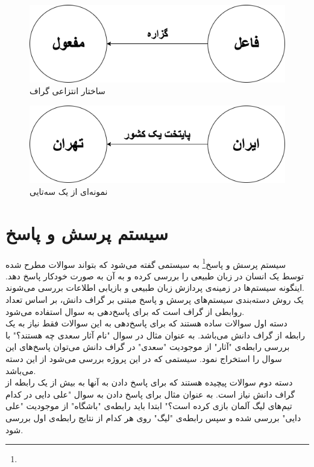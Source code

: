 \begin{multicols}{2}
\begin{figure}[H]
	\centering
	\includegraphics[scale=0.375]{figures/rdf/structure.png}
	\caption[ساختار انتزاعی گراف ]{ساختار انتزاعی گراف }
	\label{fig:rdf-strcutre}
\end{figure}
	\columnbreak
\begin{figure}[H]
	\centering
	\includegraphics[scale=0.375]{figures/rdf/sample.png}
	\caption[نمونه‌ای از یک سه‌تایی ]{نمونه‌ای از یک سه‌تایی }
	\label{fig:rdf-sample}
\end{figure}
\end{multicols}

\section{سیستم پرسش و پاسخ}
سیستم‌ پرسش و پاسخ\footnote{} به سیستمی گفته می‌شود که بتواند سوالات مطرح شده توسط یک انسان در زبان طبیعی را بررسی کرده و به آن به صورت خودکار پاسخ دهد. اینگونه سیستم‌ها در زمینه‌ی پردازش زبان طبیعی و بازیابی اطلاعات بررسی می‌شوند.\\
یک روش دسته‌بندی سیستم‌های پرسش و پاسخ مبتنی بر گراف دانش، بر اساس تعداد روابطی از گراف است که برای پاسخ‌دهی به سوال استفاده می‌شود. \\
دسته اول سوالات ساده هستند که برای پاسخ‌دهی به این سوالات فقط نیاز به یک رابطه از گراف دانش می‌باشد. به عنوان مثال در سوال "نام آثار سعدی چه هستند؟" با بررسی رابطه‌ی "آثار" از موجودیت "سعدی" در گراف دانش می‌توان پاسخ‌های این سوال را استخراج نمود. سیستمی که در این پروژه بررسی می‌شود از این دسته می‌باشد.\\دسته دوم سوالات پیچیده هستند که برای پاسخ دادن به آنها به بیش از یک رابطه از گراف دانش نیاز است. به عنوان مثال برای پاسخ دادن به سوال "علی دایی در کدام تیم‌های لیگ آلمان بازی کرده است؟" ابتدا باید رابطه‌ی "باشگاه" از موجودیت "علی دایی" بررسی شده و سپس رابطه‌ی "لیگ" روی هر کدام از نتایج رابطه‌ی اول بررسی شود.

